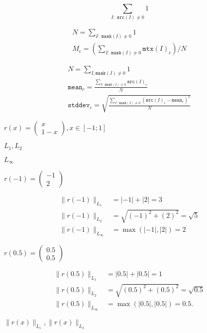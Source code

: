 \documentclass{article}
\begin{document}
\[\sum _{I: \; \texttt{src} (I) \ne0 } 1\]
\pagebreak

\[\begin{array}{l} N = \sum _{I: \; \texttt{mask} (I) \ne 0} 1 \\ M_c = \left ( \sum _{I: \; \texttt{mask} (I) \ne 0}{ \texttt{mtx} (I)_c} \right )/N \end{array}\]
\pagebreak

\[\begin{array}{l} N = \sum _{I, \texttt{mask} (I) \ne 0} 1 \\ \texttt{mean} _c = \frac{\sum_{ I: \; \texttt{mask}(I) \ne 0} \texttt{src} (I)_c}{N} \\ \texttt{stddev} _c = \sqrt{\frac{\sum_{ I: \; \texttt{mask}(I) \ne 0} \left ( \texttt{src} (I)_c - \texttt{mean} _c \right )^2}{N}} \end{array}\]
\pagebreak

$r(x)= \begin{pmatrix} x \\ 1-x \end{pmatrix}, x \in [-1;1]$
\pagebreak

$ L_{1}, L_{2} $
\pagebreak

$ L_{\infty} $
\pagebreak

$r(-1) = \begin{pmatrix} -1 \\ 2 \end{pmatrix}$
\pagebreak

\begin{align*} \| r(-1) \|_{L_1} &= |-1| + |2| = 3 \\ \| r(-1) \|_{L_2} &= \sqrt{(-1)^{2} + (2)^{2}} = \sqrt{5} \\ \| r(-1) \|_{L_\infty} &= \max(|-1|,|2|) = 2 \end{align*}
\pagebreak

$r(0.5) = \begin{pmatrix} 0.5 \\ 0.5 \end{pmatrix}$
\pagebreak

\begin{align*} \| r(0.5) \|_{L_1} &= |0.5| + |0.5| = 1 \\ \| r(0.5) \|_{L_2} &= \sqrt{(0.5)^{2} + (0.5)^{2}} = \sqrt{0.5} \\ \| r(0.5) \|_{L_\infty} &= \max(|0.5|,|0.5|) = 0.5. \end{align*}
\pagebreak

$\| r(x) \|_{L_1}, \| r(x) \|_{L_2}$
\pagebreak
\end{document}
